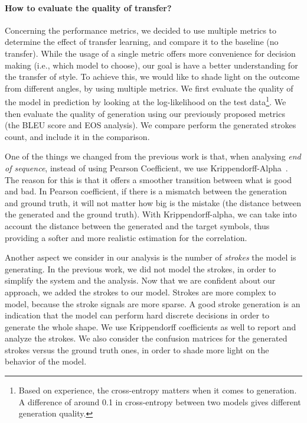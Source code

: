  \paragraph{How to evaluate the quality of transfer?} Concerning the performance metrics, we decided to use multiple metrics to determine the effect of transfer learning, and compare it to the baseline (no transfer). While the usage of a single metric offers more convenience for decision making (i.e., which model to choose), our goal is have a better understanding for the transfer of style. To achieve this, we would like to shade light on the outcome from different angles, by using multiple metrics. We first evaluate the quality of the model in prediction by looking at the log-likelihood on the test data\footnote{Based on experience, the cross-entropy matters when it comes to generation. A difference of around 0.1 in cross-entropy between two models gives different generation quality.}. We then evaluate the quality of generation using our previously proposed metrics (the BLEU score and EOS analysis). We compare perform the generated strokes count, and include it in the comparison.

  \par One of the things we changed from the previous work is that, when analysing \textit{end of sequence}, instead of using Pearson Coefficient, we use Krippendorff-Alpha~\citep{krippendorff2011computing}. The reason for this is that it offers a smoother transition between what is good and bad. In Pearson coefficient, if there is a mismatch between the generation and ground truth, it will not matter how big is the mistake (the distance between the generated and the ground truth). With Krippendorff-alpha, we can take into account the distance between the generated and the target symbols, thus providing a softer and more realistic estimation for the correlation.

  \par Another aspect we consider in our analysis is the number of \textit{strokes} the model is generating. In the previous work, we did not model the strokes, in order to simplify the system and the analysis. Now that we are confident about our approach, we added the strokes to our model. Strokes are more complex to model, because the stroke signals are more sparse. A good stroke generation is an indication that the model can perform hard discrete decisions in order to generate the whole shape. We use Krippendorff coefficients as well to report and analyze the strokes. We also consider the confusion matrices for the generated strokes versus the ground truth ones, in order to shade more light on the behavior of the model.

